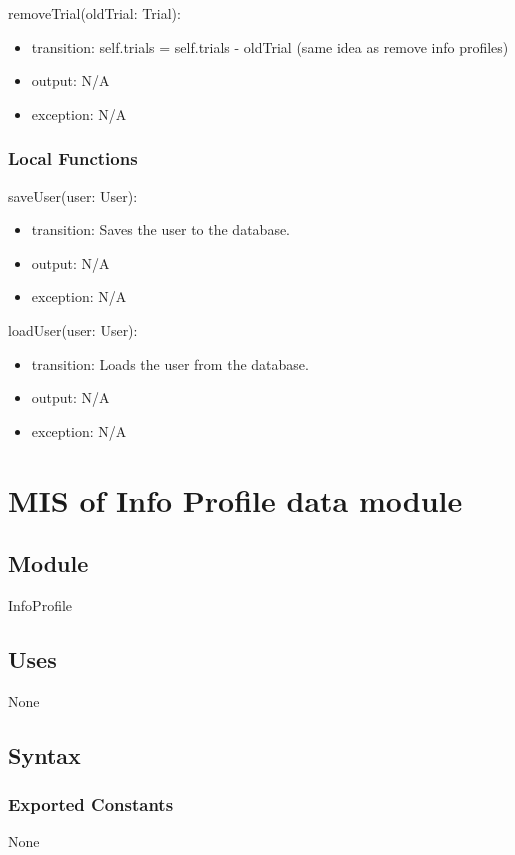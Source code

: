 \documentclass[12pt, titlepage]{article}
\begin{document}
\noindent removeTrial(oldTrial: Trial):
\begin{itemize}
\item transition: self.trials = self.trials - oldTrial (same idea as remove info profiles)
\item output: N/A
\item exception: N/A
\end{itemize}

\subsubsection{Local Functions}
\noindent saveUser(user: User):
\begin{itemize}
\item transition: Saves the user to the database.
\item output: N/A
\item exception: N/A
\end{itemize}

\noindent loadUser(user: User):
\begin{itemize}
\item transition: Loads the user from the database.
\item output: N/A
\item exception: N/A
\end{itemize}


\section{MIS of Info Profile data module}

\subsection{Module}

InfoProfile

\subsection{Uses}
None

\subsection{Syntax}

\subsubsection{Exported Constants}
None
\end{document}
